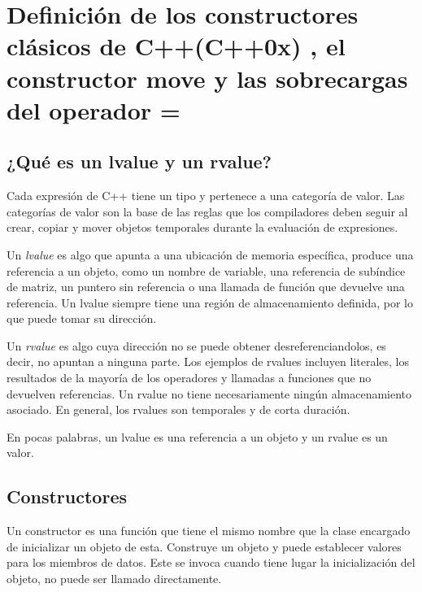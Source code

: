 \documentclass[10pt]{article}
\begin{document}
\vspace{2em}
\section{Definici\'on de  los constructores clásicos de C++(C++0x) , el constructor move y las sobrecargas del operador =}



\subsection{¿Qué es un lvalue y un rvalue?}

Cada expresión de C++ tiene un tipo y pertenece a una categoría de valor. Las categorías de valor son la base de las reglas que los compiladores deben seguir al crear, copiar y mover objetos temporales durante la evaluación de expresiones.

Un \textit{lvalue} es algo que apunta a una ubicación de memoria específica, produce una referencia a un objeto, como un nombre de variable, una referencia de subíndice de matriz, un puntero sin referencia o una llamada de función que devuelve una referencia. Un lvalue siempre tiene una región de almacenamiento definida, por lo que puede tomar su dirección.

Un \textit{rvalue} es algo cuya dirección no se puede obtener desreferenciandolos, es decir, no apuntan a ninguna parte. Los ejemplos de rvalues incluyen literales, los resultados de la mayoría de los operadores y llamadas a funciones que no devuelven referencias. Un rvalue no tiene necesariamente ningún almacenamiento asociado. En general, los rvalues son temporales y de corta duración.

En pocas palabras, un lvalue es una referencia a un objeto y un rvalue es un valor. 

\subsection{Constructores}

Un constructor es una función que tiene el mismo nombre que la clase encargado de inicializar un objeto de esta. Construye un objeto y puede establecer valores para los miembros de datos. Este se invoca cuando tiene lugar la inicialización del objeto, no puede ser llamado directamente.
\end{document}
